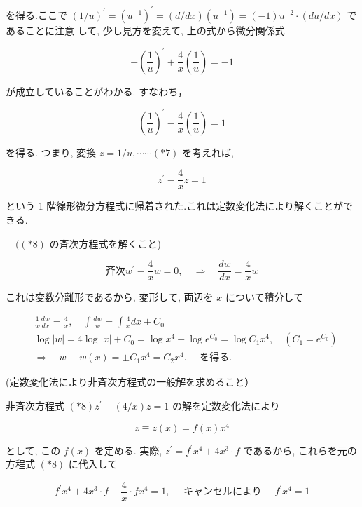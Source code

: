 \documentclass[10pt]{jsarticle}
\begin{document}
を得る.ここで $(1 / u)^{\prime}=\left(u^{-1}\right)^{\prime}=(d / d x)\left(u^{-1}\right)=(-1) u^{-2} \cdot(d u / d x)$ であることに注意 して, 少し見方を変えて, 上の式から微分関係式

$$
-\left(\frac{1}{u}\right)^{\prime}+\frac{4}{x}\left(\frac{1}{u}\right)=-1
$$

が成立していることがわかる. すなわち，


\begin{equation*}
\left(\frac{1}{u}\right)^{\prime}-\frac{4}{x}\left(\frac{1}{u}\right)=1 \tag{*6}
\end{equation*}


を得る. つまり, 変換 $z=1 / u, \cdots \cdots(* 7)$ を考えれば,


\begin{equation*}
z^{\prime}-\frac{4}{x} z=1 \tag{*8}
\end{equation*}


という 1 階線形微分方程式に帰着された.これは定数変化法により解くことができる.

$\quad((* 8)$ の斉次方程式を解くこと)

$$斉次
w^{\prime}-\frac{4}{x} w=0, \quad \Longrightarrow \quad \frac{d w}{d x}=\frac{4}{x} w
$$

これは変数分離形であるから, 変形して, 両辺を $x$ について積分して

$$
\begin{aligned}
& \frac{1}{w} \frac{d w}{d x}=\frac{4}{x}, \quad \int \frac{d w}{w}=\int \frac{4}{x} d x+C_{0} \\
& \log |w|=4 \log |x|+C_{0}=\log x^{4}+\log e^{C_{0}}=\log C_{1} x^{4}, \quad\left(C_{1}=e^{C_{0}}\right) \\
& \Longrightarrow \quad w \equiv w(x)= \pm C_{1} x^{4}=C_{2} x^{4} . \quad \text { を得る. }
\end{aligned}
$$

(定数変化法により非斉次方程式の一般解を求めること）

非斉次方程式 $(* 8) z^{\prime}-(4 / x) z=1$ の解を定数変化法により


\begin{equation*}
z \equiv z(x)=f(x) x^{4} \tag{*9}
\end{equation*}


として, この $f(x)$ を定める. 実際, $z^{\prime}=f^{\prime} x^{4}+4 x^{3} \cdot f$ であるから, これらを元の方程式 $(* 8)$ に代入して

$$
f^{\prime} x^{4}+4 x^{3} \cdot f-\frac{4}{x} \cdot f x^{4}=1, \quad \text { キャンセルにより } \quad f^{\prime} x^{4}=1
$$
\end{document}
